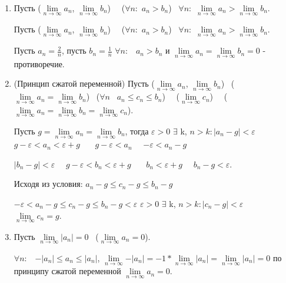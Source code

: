 \documentclass{article}
\begin{document}
\begin{enumerate}
\item Пусть (\exists $\lim\limits_{n\to\infty}{a_n}$, \exists $\lim\limits_{n\to\infty}{b_n}$) \ \bigwedge \ ($\forall n:$ $a_n>b_n$) \not \Rightarrow \ $\forall n:$ $\lim\limits_{n\to\infty}{a_n}> \lim\limits_{n\to\infty}{b_n}$.

\proof

Пусть (\exists $\lim\limits_{n\to\infty}{a_n}$, \exists $\lim\limits_{n\to\infty}{b_n}$) \ \bigwedge \ ($\forall n:$ $a_n>b_n$) \implies \ $\forall n:$ $\lim\limits_{n\to\infty}{a_n}> \lim\limits_{n\to\infty}{b_n}$.

Пусть $a_n=\frac{2}{n}$, пусть $b_n=\frac{1}{n}$ \implies $\forall n:$ \ $a_n>b_n$ и $\lim\limits_{n\to\infty}{a_n}=\lim\limits_{n\to\infty}{b_n}=0$ - противоречие.

\item (Принцип сжатой переменной) Пусть (\exists $\lim\limits_{n\to\infty}{a_n}$, \exists $\lim\limits_{n\to\infty}{b_n}$) \bigwedge \ ($\lim\limits_{n\to\infty}{a_n}=\lim\limits_{n\to\infty}{b_n}$) \bigwedge \ ($\forall n$ \ $a_n\leq c_n \leq b_n$) \ \implies \ (\exists $\lim\limits_{n\to\infty}{c_n}$) \ \bigwedge \ ($\lim\limits_{n\to\infty}{a_n}=\lim\limits_{n\to\infty}{b_n}=\lim\limits_{n\to\infty}{c_n}$).

\proof 

Пусть $g=\lim\limits_{n\to\infty}{a_n}=\lim\limits_{n\to\infty}{b_n}$, тогда \forall $\varepsilon>0$ $\exists$ k, \forall $n>k: 

|a_n-g|<\varepsilon$ \ \Leftrightarrow \ $g-\varepsilon<a_n<\varepsilon+g$ \ \ \ $g-\varepsilon<a_n$ \ \Leftrightarrow \ $-\varepsilon<a_n-g$

$|b_n-g|<\varepsilon$ \ \Leftrightarrow \ $g-\varepsilon<b_n<\varepsilon+g$ \ \ \ $b_n<\varepsilon+g$ \ \Leftrightarrow \ $b_n-g<\varepsilon$.

Исходя из условия: $a_n-g\leq c_n-g\leq b_n-g$

$-\varepsilon<a_n-g\leq c_n-g\leq b_n-g<\varepsilon$ \implies \forall $\varepsilon>0$ $\exists$ k, \forall $n>k: |c_n-g|<\varepsilon$  \ \implies \exists \ $\lim\limits_{n\to\infty}{c_n}=g$.

\item Пусть \exists $\lim\limits_{n\to\infty}{|a_n|}=0$ \implies \ ($\lim\limits_{n\to\infty}{a_n}=0$).

\proof

$\forall n:$ \ $-|a_n|\leq a_n \leq |a_n|$, $\lim\limits_{n\to\infty}{-|a_n|}=-1*\lim\limits_{n\to\infty}{|a_n|}=\lim\limits_{n\to\infty}{|a_n|}=0$ \implies по принципу сжатой переменной $\lim\limits_{n\to\infty}{a_n}=0$.

\end{enumerate}
\end{document}
